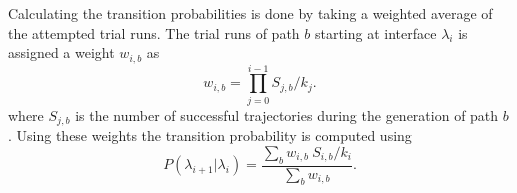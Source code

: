 Calculating the transition probabilities is done by taking a weighted average of the
attempted trial runs. The trial runs of path $b$ starting at interface
$\lambda_i$ is assigned a  weight $w_{i,b}$ as
\begin{equation}
   w_{i,b} = \prod_{j=0}^{i-1} S_{j,b}/k_j.
\end{equation}
where $S_{j,b}$ is the number of successful trajectories during the
generation of path $b$. Using these weights the transition probability is computed using
\begin{equation}
   P(\lambda_{i+1} | \lambda_i) = \frac{\sum_{b} w_{i,b}\ S_{i,b}/k_i}{\sum_b w_{i,b}}.
\end{equation}


